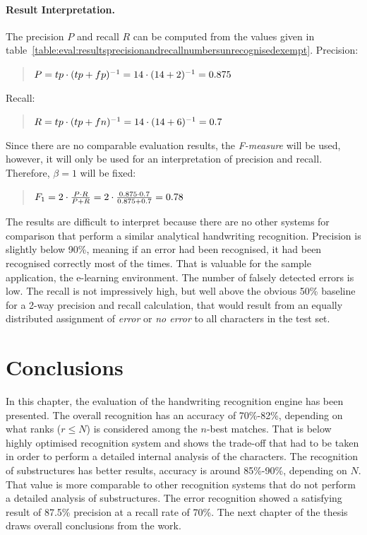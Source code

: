 \paragraph{Result Interpretation.}
The precision \(P\) and recall \(R\) can be computed from the values given in 
table~\ref{table:eval:resultsprecisionandrecallnumbersunrecognisedexempt}.
Precision:
\begin{quote}
\(
P=tp \cdot (tp+fp)^{-1} \\
= 14 \cdot (14+2)^{-1} \\
= 0.875
\)
\end{quote}
Recall:
\begin{quote}
\(
R=tp \cdot (tp+fn)^{-1} \\
=14 \cdot (14+6)^{-1} \\
=0.7
\)  
\end{quote}
Since there are no comparable evaluation results, 
the \emph{F-measure} will be used, however, it will only be used
for an interpretation of precision and 
recall. Therefore, \(\beta = 1\) will
be fixed:
\begin{quote}
\(
F_{1} = 2 \cdot \frac{P \cdot R }{P + R} \\
 = 2 \cdot \frac{0.875 \cdot 0.7 }{0.875 + 0.7} \\
 = 0.78
\)
\end{quote}
The results are difficult to interpret because there are no other systems for 
comparison that perform a similar analytical handwriting recognition.
Precision is slightly below 90\%, meaning if an error had been recognised,
it had been recognised correctly most of the times.
That is valuable for the sample application, the e-learning environment.
The number of falsely detected errors is low.
The recall is not impressively high, 
but well above the obvious 50\% baseline for a 2-way precision 
and recall calculation, that would result from an equally distributed assignment 
of \emph{error} or \emph{no error} to all characters in the test set.

\section{Conclusions}
\label{sec:eval:conclusions}

In this chapter, the evaluation of the handwriting recognition engine has 
been presented. The overall recognition has an accuracy of 70\%-82\%,
depending on what ranks (\(r \leq N\)) is considered among the \(n\)-best 
matches.
That is below highly optimised recognition system and shows the trade-off that
had to be taken in order to perform a detailed internal analysis of the 
characters.
The recognition of substructures has better results, accuracy is around
85\%-90\%, depending on \(N\). That value is more comparable to other 
recognition systems that do not perform a detailed analysis of substructures.
The error recognition showed a satisfying result of 87.5\% precision at a recall 
rate of 70\%.
The next chapter of the thesis draws overall conclusions from the work.

